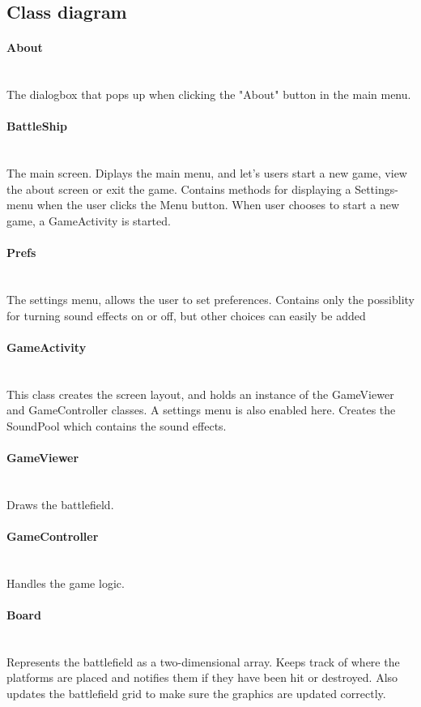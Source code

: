 \documentclass[12pt, a4paper]{article}
\begin{document}
\subsection{Class diagram}

\paragraph{About} \\
	The dialogbox that pops up when clicking the "About" button in the main menu.

\paragraph{BattleShip} \\
	The main screen. Diplays the main menu, and let's users start a new game, view the about screen or exit the game. Contains methods for displaying a Settings-menu when the user clicks the Menu button.
When user chooses to start a new game, a GameActivity is started.

\paragraph{Prefs} \\
	The settings menu, allows the user to set preferences. Contains only the possiblity for turning sound effects on or off, but other choices can easily be added

\paragraph{GameActivity} \\
	This class creates the screen layout, and holds an instance of the GameViewer and GameController classes. A settings menu is also enabled here. Creates the SoundPool which contains the sound effects.

\paragraph{GameViewer} \\
	Draws the battlefield.

\paragraph{GameController} \\
	Handles the game logic.

\paragraph{Board} \\
	Represents the battlefield as a two-dimensional array. Keeps track of where the platforms are placed and notifies them if they have been hit or destroyed. Also updates the battlefield grid to make sure the graphics are updated correctly.
\end{document}
